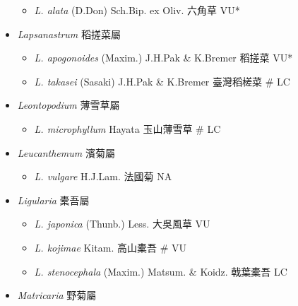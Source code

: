 \begin{itemize}
  \begin{itemize}
        \item[] \textit{L. alata} (D.Don) Sch.Bip. ex Oliv.  六角草   VU*
  \end{itemize}
 \item[] \textit{Lapsanastrum} 稻搓菜屬
                                
  \begin{itemize}
        \item[] \textit{L. apogonoides} (Maxim.) J.H.Pak \& K.Bremer  稻搓菜   VU*
        \item[] \textit{L. takasei} (Sasaki) J.H.Pak \& K.Bremer  臺灣稻槎菜  \# LC
  \end{itemize}
 \item[] \textit{Leontopodium} 薄雪草屬
                                
  \begin{itemize}
        \item[] \textit{L. microphyllum} Hayata  玉山薄雪草  \# LC
  \end{itemize}
 \item[] \textit{Leucanthemum} 濱菊屬
                                
  \begin{itemize}
        \item[] \textit{L. vulgare} H.J.Lam.  法國菊   NA
  \end{itemize}
 \item[] \textit{Ligularia} 橐吾屬
                                
  \begin{itemize}
        \item[] \textit{L. japonica} (Thunb.) Less.  大吳風草   VU
        \item[] \textit{L. kojimae} Kitam.  高山橐吾  \# VU
        \item[] \textit{L. stenocephala} (Maxim.) Matsum. \& Koidz.  戟葉橐吾   LC
  \end{itemize}
 \item[] \textit{Matricaria} 野菊屬
                                

\end{itemize}
